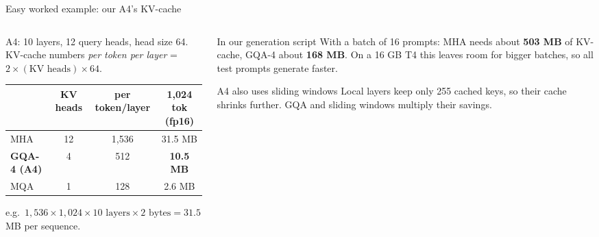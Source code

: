 \documentclass[aspectratio=169,11pt]{beamer}
\begin{document}
\begin{frame}{Easy worked example: our A4's KV-cache}
  \begin{columns}[T]
    \begin{column}{0.52\textwidth}
      \small
      A4: 10 layers, 12 query heads, head size 64. KV-cache numbers \emph{per token per layer} = $2\times(\text{KV heads})\times64$.
      \vspace{1mm}

      \scriptsize
      \begin{tabular}{@{}lccc@{}}
        \toprule
        & KV heads & per token/layer & 1,024 tok (fp16)\\
        \midrule
        MHA & 12 & 1,536 & 31.5 MB\\
        \textbf{GQA-4 (A4)} & 4 & 512 & \textbf{10.5 MB}\\
        MQA & 1 & 128 & 2.6 MB\\
        \bottomrule
      \end{tabular}
      \vspace{1mm}

      {\scriptsize e.g.\ $1{,}536\times1{,}024\times10\text{ layers}\times2\text{ bytes}=31.5$ MB per sequence.}
    \end{column}
    \begin{column}{0.44\textwidth}
      \begin{exampleblock}{In our generation script}
        \small
        With a batch of 16 prompts: MHA needs about \textbf{503 MB} of KV-cache, GQA-4 about \textbf{168 MB}.
        On a 16 GB T4 this leaves room for bigger batches, so all test prompts generate faster.
      \end{exampleblock}
      \begin{block}{A4 also uses sliding windows}
        \small
        Local layers keep only 255 cached keys, so their cache shrinks further. GQA and sliding windows multiply their savings.
      \end{block}
    \end{column}
  \end{columns}
\end{frame}
\end{document}
